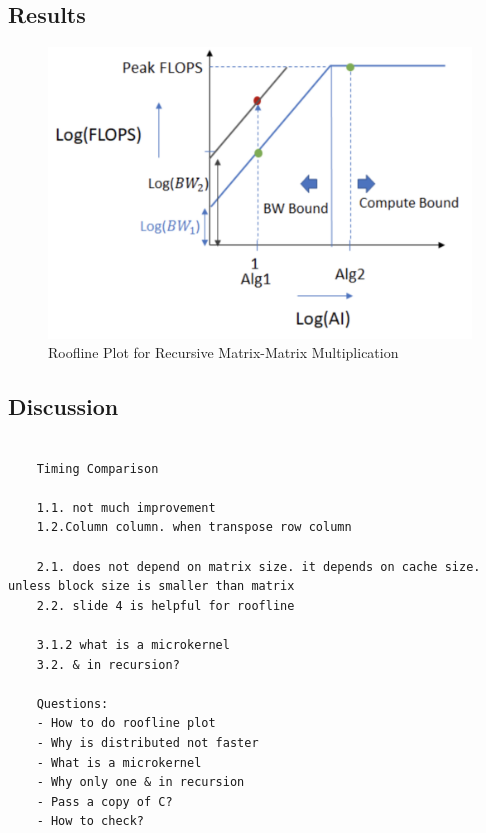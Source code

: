 \documentclass{article}
\begin{document}
\subsection{Results}
\begin{figure}[!htb]
    \centering
    \includegraphics[width=0.8\linewidth]{roofline_plot.png}
    \caption{Roofline Plot for Recursive Matrix-Matrix Multiplication}
\end{figure}

\subsection{Discussion}

\begin{verbatim}

    Timing Comparison

    1.1. not much improvement
    1.2.Column column. when transpose row column

    2.1. does not depend on matrix size. it depends on cache size. unless block size is smaller than matrix
    2.2. slide 4 is helpful for roofline

    3.1.2 what is a microkernel
    3.2. & in recursion?

    Questions:
    - How to do roofline plot
    - Why is distributed not faster
    - What is a microkernel
    - Why only one & in recursion
    - Pass a copy of C?
    - How to check?

\end{verbatim}

\end{document}
